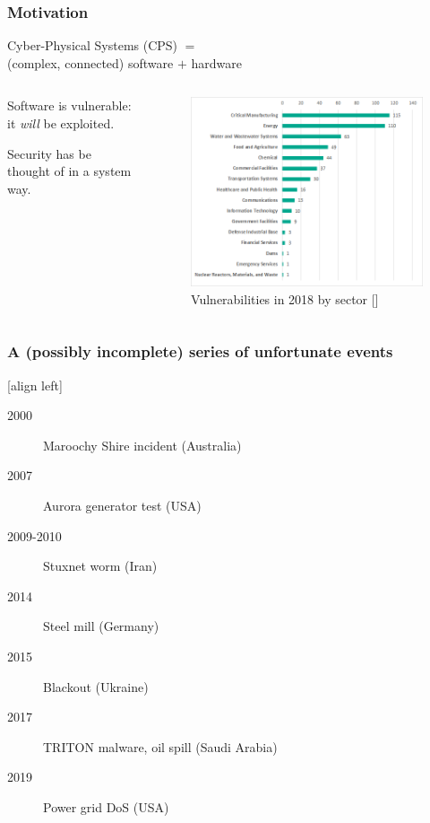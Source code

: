 \documentclass[presentation]{beamer}
\begin{document}
\begin{frame}
	\frametitle{Motivation}
	\begin{center}
		Cyber-Physical Systems (CPS) $=$ \\ (complex, connected) software $+$ hardware
	\end{center}
	\vspace{-1ex}
	\begin{columns}
		\begin{column}{0.35\textwidth}
			Software is vulnerable: it \emph{will} be exploited. 

			\vspace{3ex}
			Security has be thought of in a system way.
		\end{column}
		\begin{column}{0.64\textwidth}
			\begin{figure}
				\includegraphics[scale=0.44]{fig/vuln-report-ics-cert.png}
				\caption*{\footnotesize Vulnerabilities in 2018 by sector [\href{https://ics-cert.us-cert.gov/}{}]}
			\end{figure}
		\end{column}
	\end{columns}
\end{frame}

\begin{frame}
	\frametitle{A (possibly incomplete) series of unfortunate events}
	[align left]
	\begin{description}
		\item[2000] Maroochy Shire incident (Australia)
		\item[2007] Aurora generator test (USA)
		\item[2009-2010] Stuxnet worm (Iran)
		\item[2014] Steel mill (Germany)
		\item[2015] Blackout (Ukraine)
		\item[2017] TRITON malware, oil spill (Saudi Arabia)
		\item[2019] Power grid DoS (USA)  
	\end{description}
\end{frame}
\end{document}
